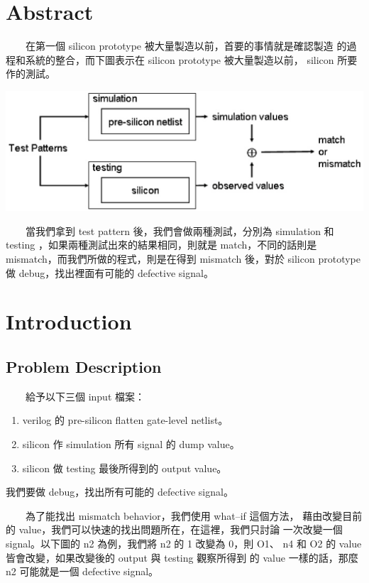 \documentclass[12pt,a4paper]{article}
\begin{document}


\section{Abstract}

　　在第一個 silicon prototype 被大量製造以前，首要的事情就是確認製造%
的過程和系統的整合，而下圖表示在 silicon prototype 被大量製造以前，%
silicon 所要作的測試。

\begin{center}
\includegraphics[scale=0.6]{imgs/01.eps}
\end{center}

　　當我們拿到 test pattern 後，我們會做兩種測試，分別為 simulation %
和 testing ，如果兩種測試出來的結果相同，則就是 match，不同的話則是%
mismatch，而我們所做的程式，則是在得到 mismatch 後，對於 silicon %
prototype 做 debug，找出裡面有可能的 defective signal。

\section{Introduction}

\subsection{Problem Description}

　　給予以下三個 input 檔案：

\begin{enumerate}
\item verilog 的 pre-silicon flatten gate-level netlist。
\item silicon 作 simulation 所有 signal 的 dump value。
\item silicon 做 testing 最後所得到的 output value。
\end{enumerate}

我們要做 debug，找出所有可能的 defective signal。

　　為了能找出 mismatch behavior，我們使用 what–if 這個方法，%
藉由改變目前的 value，我們可以快速的找出問題所在，在這裡，我們只討論%
一次改變一個 signal。以下圖的 n2 為例，我們將 n2 的 1 改變為 0，則 O1、%
n4 和 O2 的 value 皆會改變，如果改變後的 output 與 testing 觀察所得到%
的 value 一樣的話，那麼 n2 可能就是一個 defective signal。
\end{document}
